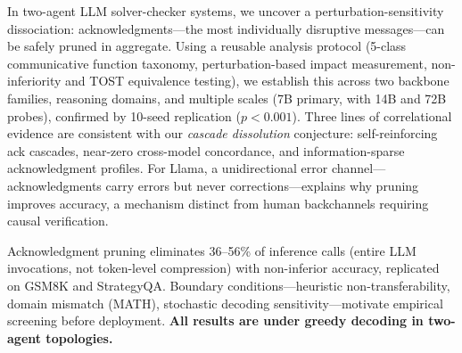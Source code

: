 In two-agent LLM solver-checker systems, we uncover a perturbation-sensitivity dissociation: acknowledgments---the most individually disruptive messages---can be safely pruned in aggregate. Using a reusable analysis protocol (5-class communicative function taxonomy, perturbation-based impact measurement, non-inferiority and TOST equivalence testing), we establish this across two backbone families, \numValidatedDomains{} reasoning domains, and multiple scales (7B primary, with 14B and 72B probes), confirmed by 10-seed replication ($p < 0.001$). Three lines of correlational evidence are consistent with our \emph{cascade dissolution} conjecture: self-reinforcing ack cascades, near-zero cross-model concordance, and information-sparse acknowledgment profiles. For Llama, a unidirectional error channel---acknowledgments carry errors but never corrections---explains why pruning improves accuracy, a mechanism distinct from human backchannels requiring causal verification.

Acknowledgment pruning eliminates 36--56\% of inference calls (entire LLM invocations, not token-level compression) with non-inferior accuracy, replicated on GSM8K and StrategyQA. Boundary conditions---heuristic non-transferability, domain mismatch (MATH), stochastic decoding sensitivity---motivate empirical screening before deployment. \textbf{All results are under greedy decoding in two-agent topologies.}
